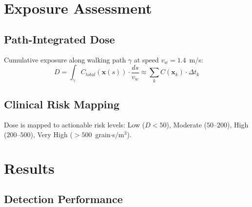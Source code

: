 \documentclass[11pt]{article}
\begin{document}
\section{Exposure Assessment}

\subsection{Path-Integrated Dose}

Cumulative exposure along walking path $\gamma$ at speed $v_w = 1.4$~m/s:
\begin{equation}
D = \int_\gamma C_{total}(\mathbf{x}(s)) \cdot \frac{ds}{v_w} \approx \sum_k C(\mathbf{x}_k) \cdot \Delta t_k
\end{equation}

\subsection{Clinical Risk Mapping}

Dose is mapped to actionable risk levels: Low ($D < 50$), Moderate ($50$--$200$), High ($200$--$500$), Very High ($>500$~grain$\cdot$s/m$^3$).

\section{Results}
\label{sec:results}

\subsection{Detection Performance}
\end{document}
